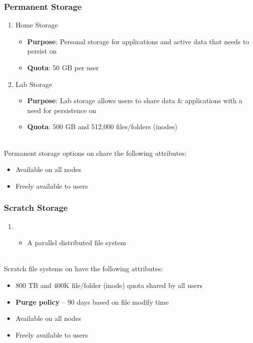 \begin{frame}
  \frametitle{Permanent Storage}
  \begin{enumerate}
  \item Home Storage
    \begin{itemize}
    \item {\textbf{Purpose}}: Personal storage for applications and active data that needs to persist on {\mana}
		\item {\textbf{Quota}}: 50 GB per user
    \end{itemize}
  \item Lab Storage
    \begin{itemize}
    \item {\textbf{Purpose}}: Lab storage allows users to share data \& applications with a need for persistence on {\mana}
		\item {\textbf{Quota}}: 500 GB and 512,000 files/folders (inodes)
    \end{itemize}
  \end{enumerate}
~\\
  Permanent storage options on {\mana} share the following attributes:
  \begin{itemize}
  \item Available on all nodes
  \item Freely available to users
  \end{itemize}

\end{frame}


\begin{frame}
  \frametitle{Scratch Storage}
  \begin{enumerate}
    \item {\lustre}
      \begin{itemize}
			\item A parallel distributed file system 
      \end{itemize}
  \end{enumerate}
~\\
  Scratch file systems on {\mana} have the following attributes:
  \begin{itemize}
	\item 800 TB and 400K file/folder (inode) quota shared by all users
  \item \textbf{Purge policy} -- 90 days based on file modify time
  \item Available on all nodes
  \item Freely available to users
  \end{itemize}

\end{frame}




